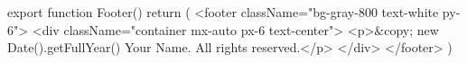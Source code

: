 export function Footer() {
  return (
    <footer className="bg-gray-800 text-white py-6">
      <div className="container mx-auto px-6 text-center">
        <p>&copy; {new Date().getFullYear()} Your Name. All rights reserved.</p>
      </div>
    </footer>
  )
}

